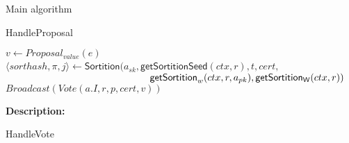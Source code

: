 \documentclass[10pt,a4paper]{article}
\begin{document}
\begin{section}{Main algorithm}


\begin{subsection}{HandleProposal}\label{ssect:HandleProposal}

    \begin{algorithm}[H]
        \begin{algorithmic}[1]



            \State $v \gets Proposal_{value}(e)$
                    \State $\langle sorthash, \pi, j\rangle\gets 
                    \mathsf{Sortition}(
                    a_{sk}, 
                    \mathsf{getSortitionSeed}(ctx, r), 
                    t, 
                    cert, $ \newline
                    ${}$ ${\hskip 5.2cm}\mathsf{getSortition}_w(ctx, r, a_{pk}), 
                    \mathsf{getSortition_W}(ctx, r)
                    )$
                        \State $Broadcast(Vote(a.I, r, p, cert, v))$
                    \EndIf
                \EndFor    
            \EndIf

        \EndFunction
        \end{algorithmic}
        \caption{\underline{HandleProposal}}
    \end{algorithm}
    
    
    \noindent \textbf{Description:}\\
    
\end{subsection}


\begin{subsection}{HandleVote}\label{ssect:HandleVote}

    \begin{algorithm}[H]
        \begin{algorithmic}[1]


\end{algorithmic}
\end{algorithm}
\end{subsection}
\end{section}
\end{document}

